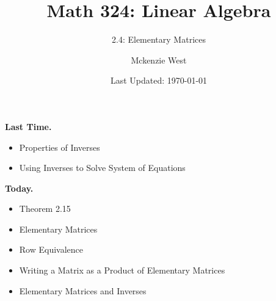 \documentclass[handout]{beamer}
\theoremstyle{definition}
\begin{document}
	\title{Math 324: Linear Algebra}
	\subtitle{2.4: Elementary Matrices}
	\author{Mckenzie West}
	\date{Last Updated: \today}
\begin{frame}
\maketitle
\end{frame}

\begin{frame}{\insertframenumber}
	\begin{block}{\textbf{Last Time.}}
	\begin{itemize}[label=--]
		\item Properties of Inverses
		\item Using Inverses to Solve System of Equations
	\end{itemize}
	\end{block}
\begin{block}{\textbf{Today.}}
	\begin{itemize}[label=--]
		\item Theorem 2.15
		\item Elementary Matrices
		\item Row Equivalence
		\item Writing a Matrix as a Product of Elementary Matrices
		\item Elementary Matrices and Inverses
	\end{itemize}
\end{block}
\end{frame}
\end{document}
